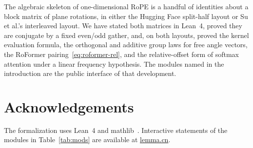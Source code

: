 \documentclass[11pt,a4paper]{article}
\begin{document}
The algebraic skeleton of one-dimensional RoPE is a handful of identities about a block matrix of plane rotations, in either the Hugging Face split-half layout or Su et al.'s interleaved layout.
We have stated both matrices in Lean~4, proved they are conjugate by a fixed even/odd gather, and, on both layouts, proved the kernel evaluation formula, the orthogonal and additive group laws for free angle vectors, the RoFormer pairing~\eqref{eq:roformer-rel}, and the relative-offset form of softmax attention under a linear frequency hypothesis.
The modules named in the introduction are the public interface of that development.

\section*{Acknowledgements}

The formalization uses Lean~4 and mathlib~\cite{moura2021lean4,mathlib2020}.
Interactive statements of the modules in Table~\ref{tab:mods} are available at \href{http://www.lemma.cn/}{lemma.cn}.



\end{document}
